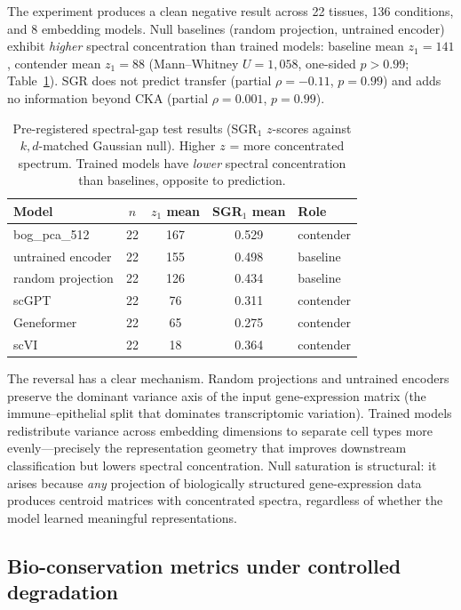 \documentclass[11pt]{article}
\begin{document}
The experiment produces a clean negative result across 22 tissues,
136 conditions, and 8 embedding models. Null baselines (random
projection, untrained encoder) exhibit \emph{higher} spectral
concentration than trained models: baseline mean $z_1 = 141$,
contender mean $z_1 = 88$ (Mann--Whitney $U = 1{,}058$, one-sided
$p > 0.99$; Table~\ref{tab:sgr}). SGR does not predict transfer
(partial $\rho = -0.11$, $p = 0.99$) and adds no information beyond
CKA (partial $\rho = 0.001$, $p = 0.99$).

\begin{table}[t]
\centering
\caption{Pre-registered spectral-gap test results (SGR$_1$ $z$-scores
against $k,d$-matched Gaussian null). Higher $z$ = more concentrated
spectrum. Trained models have \emph{lower} spectral concentration than
baselines, opposite to prediction.}
\label{tab:sgr}
\small
\begin{tabular}{@{}lcccl@{}}
\toprule
Model & $n$ & $z_1$ mean & SGR$_1$ mean & Role \\
\midrule
bog\_pca\_512           & 22 & 167 & 0.529 & contender \\
untrained encoder       & 22 & 155 & 0.498 & baseline \\
random projection       & 22 & 126 & 0.434 & baseline \\
scGPT                   & 22 & 76  & 0.311 & contender \\
Geneformer              & 22 & 65  & 0.275 & contender \\
scVI                    & 22 & 18  & 0.364 & contender \\
\bottomrule
\end{tabular}
\end{table}

The reversal has a clear mechanism. Random projections and untrained
encoders preserve the dominant variance axis of the input gene-expression
matrix (the immune--epithelial split that dominates transcriptomic
variation). Trained models redistribute variance across embedding
dimensions to separate cell types more evenly---precisely the
representation geometry that improves downstream classification but
lowers spectral concentration. Null saturation is structural: it
arises because \emph{any} projection of biologically structured
gene-expression data produces centroid matrices with concentrated
spectra, regardless of whether the model learned meaningful
representations.


\subsection{Bio-conservation metrics under controlled degradation}
\label{sec:noise}
\end{document}
